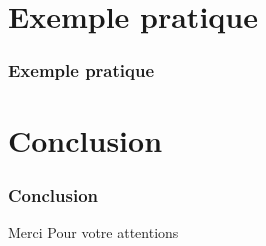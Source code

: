 \documentclass[11pt]{beamer}
\begin{document}
\section{Exemple pratique}

\begin{frame}
	\frametitle{Exemple pratique}
\end{frame}
\section{Conclusion}

\begin{frame}
	\frametitle{Conclusion}
\end{frame}

\begin{frame}[plain]
	\begin{center}
		{\Huge Merci Pour votre attentions}
		\bigskip\bigskip %
	\end{center}
\end{frame}

\end{document}
